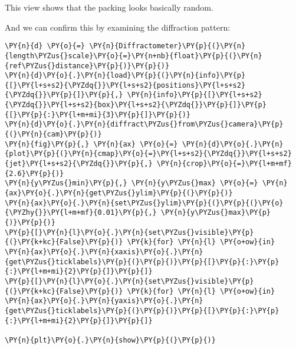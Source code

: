             
    
    \begin{center}
    \end{center}
    

    This view shows that the packing looks basically random.

And we can confirm this by examining the diffraction pattern:

    \begin{tcolorbox}[breakable, size=fbox, boxrule=1pt, pad at break*=1mm,colback=cellbackground, colframe=cellborder]
\begin{Verbatim}[commandchars=\\\{\}]
\PY{n}{d} \PY{o}{=} \PY{n}{Diffractometer}\PY{p}{(}\PY{n}{length\PYZus{}scale}\PY{o}{=}\PY{n+nb}{float}\PY{p}{(}\PY{n}{ref\PYZus{}distance}\PY{p}{)}\PY{p}{)}
\PY{n}{d}\PY{o}{.}\PY{n}{load}\PY{p}{(}\PY{n}{info}\PY{p}{[}\PY{l+s+s2}{\PYZdq{}}\PY{l+s+s2}{positions}\PY{l+s+s2}{\PYZdq{}}\PY{p}{]}\PY{p}{,} \PY{n}{info}\PY{p}{[}\PY{l+s+s2}{\PYZdq{}}\PY{l+s+s2}{box}\PY{l+s+s2}{\PYZdq{}}\PY{p}{]}\PY{p}{[}\PY{p}{:}\PY{l+m+mi}{3}\PY{p}{]}\PY{p}{)}
\PY{n}{d}\PY{o}{.}\PY{n}{diffract\PYZus{}from\PYZus{}camera}\PY{p}{(}\PY{n}{cam}\PY{p}{)}
\PY{n}{fig}\PY{p}{,} \PY{n}{ax} \PY{o}{=} \PY{n}{d}\PY{o}{.}\PY{n}{plot}\PY{p}{(}\PY{n}{cmap}\PY{o}{=}\PY{l+s+s2}{\PYZdq{}}\PY{l+s+s2}{jet}\PY{l+s+s2}{\PYZdq{}}\PY{p}{,} \PY{n}{crop}\PY{o}{=}\PY{l+m+mf}{2.6}\PY{p}{)}
\PY{n}{y\PYZus{}min}\PY{p}{,} \PY{n}{y\PYZus{}max} \PY{o}{=} \PY{n}{ax}\PY{o}{.}\PY{n}{get\PYZus{}ylim}\PY{p}{(}\PY{p}{)}
\PY{n}{ax}\PY{o}{.}\PY{n}{set\PYZus{}ylim}\PY{p}{(}\PY{p}{(}\PY{o}{\PYZhy{}}\PY{l+m+mf}{0.01}\PY{p}{,} \PY{n}{y\PYZus{}max}\PY{p}{)}\PY{p}{)}
\PY{p}{[}\PY{n}{l}\PY{o}{.}\PY{n}{set\PYZus{}visible}\PY{p}{(}\PY{k+kc}{False}\PY{p}{)} \PY{k}{for} \PY{n}{l} \PY{o+ow}{in} \PY{n}{ax}\PY{o}{.}\PY{n}{xaxis}\PY{o}{.}\PY{n}{get\PYZus{}ticklabels}\PY{p}{(}\PY{p}{)}\PY{p}{[}\PY{p}{:}\PY{p}{:}\PY{l+m+mi}{2}\PY{p}{]}\PY{p}{]}
\PY{p}{[}\PY{n}{l}\PY{o}{.}\PY{n}{set\PYZus{}visible}\PY{p}{(}\PY{k+kc}{False}\PY{p}{)} \PY{k}{for} \PY{n}{l} \PY{o+ow}{in} \PY{n}{ax}\PY{o}{.}\PY{n}{yaxis}\PY{o}{.}\PY{n}{get\PYZus{}ticklabels}\PY{p}{(}\PY{p}{)}\PY{p}{[}\PY{p}{:}\PY{p}{:}\PY{l+m+mi}{2}\PY{p}{]}\PY{p}{]}

\PY{n}{plt}\PY{o}{.}\PY{n}{show}\PY{p}{(}\PY{p}{)}
\end{Verbatim}
\end{tcolorbox}

